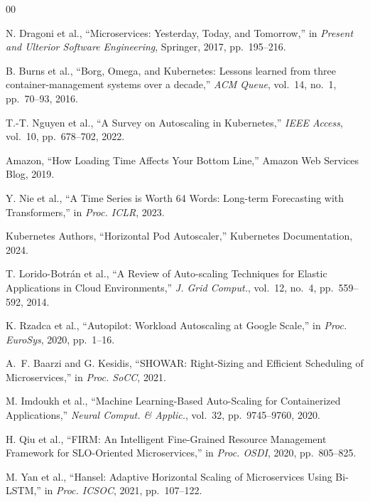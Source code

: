 \documentclass[conference]{IEEEtran}
\begin{document}
\begin{thebibliography}{00}

 N. Dragoni et al., ``Microservices: Yesterday, Today, and Tomorrow,'' in \textit{Present and Ulterior Software Engineering}, Springer, 2017, pp.~195--216.

 B. Burns et al., ``Borg, Omega, and Kubernetes: Lessons learned from three container-management systems over a decade,'' \textit{ACM Queue}, vol.~14, no.~1, pp.~70--93, 2016.

 T.-T. Nguyen et al., ``A Survey on Autoscaling in Kubernetes,'' \textit{IEEE Access}, vol.~10, pp.~678--702, 2022.

 Amazon, ``How Loading Time Affects Your Bottom Line,'' Amazon Web Services Blog, 2019.

 Y. Nie et al., ``A Time Series is Worth 64 Words: Long-term Forecasting with Transformers,'' in \textit{Proc. ICLR}, 2023.

 Kubernetes Authors, ``Horizontal Pod Autoscaler,'' Kubernetes Documentation, 2024.

 T. Lorido-Botr\'an et al., ``A Review of Auto-scaling Techniques for Elastic Applications in Cloud Environments,'' \textit{J. Grid Comput.}, vol.~12, no.~4, pp.~559--592, 2014.

 K. Rzadca et al., ``Autopilot: Workload Autoscaling at Google Scale,'' in \textit{Proc. EuroSys}, 2020, pp.~1--16.

 A.~F. Baarzi and G. Kesidis, ``SHOWAR: Right-Sizing and Efficient Scheduling of Microservices,'' in \textit{Proc. SoCC}, 2021.

 M. Imdoukh et al., ``Machine Learning-Based Auto-Scaling for Containerized Applications,'' \textit{Neural Comput. \& Applic.}, vol.~32, pp.~9745--9760, 2020.

 H. Qiu et al., ``FIRM: An Intelligent Fine-Grained Resource Management Framework for SLO-Oriented Microservices,'' in \textit{Proc. OSDI}, 2020, pp.~805--825.

 M. Yan et al., ``Hansel: Adaptive Horizontal Scaling of Microservices Using Bi-LSTM,'' in \textit{Proc. ICSOC}, 2021, pp.~107--122.


\end{thebibliography}
\end{document}
